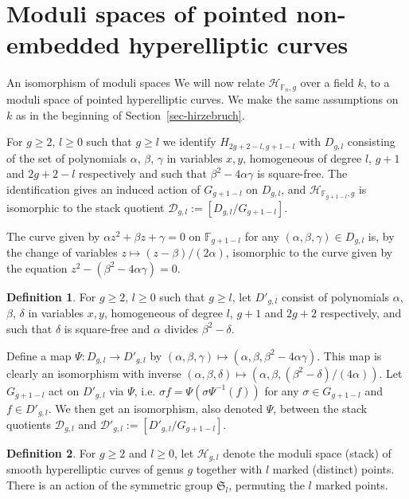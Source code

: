 \documentclass[10pt,a4paper,twoside]{amsart}
\theoremstyle{plain}
\theoremstyle{definition}
\newtheorem{defin}{Definition}
\theoremstyle{remark}
\begin{document}
\section{Moduli spaces of pointed non-embedded hyperelliptic curves}  
\begin{subsection}{An isomorphism of moduli spaces} \label{sec-iso} 
We will now relate $\mathcal{H}_{\mathbb{F}_n,g}$ over a field $k$, to a moduli space of pointed hyperelliptic curves. We make the same assumptions on $k$ as in the beginning of Section~\ref{sec-hirzebruch}.

For $g \geq 2$, $l \geq 0$ such that $g \geq l$ we identify $H_{2g+2-l,g+1-l}$ with $D_{g,l}$ consisting of the set of polynomials $\alpha$, $\beta$, $\gamma$ in variables $x,y$, homogeneous of degree $l$, $g+1$ and $2g+2-l$ respectively and such that $\beta^2-4\alpha\gamma$ is square-free. 
The identification gives an induced action of $G_{g+1-l}$ on $D_{g,l}$, and $\mathcal{H}_{\mathbb{F}_{g+1-l},g}$ is isomorphic to the stack quotient $\mathcal D_{g,l}:=[D_{g,l}/G_{g+1-l}]$. 

The curve given by $\alpha z^2+\beta z+\gamma=0$ on $\mathbb{F}_{g+1-l}$ for any $(\alpha,\beta,\gamma) \in D_{g,l}$ is, by the change of variables 
$z \mapsto (z-\beta)/(2\alpha)$, isomorphic to the curve given by the equation $z^2-(\beta^2-4\alpha \gamma)=0$. 
\begin{defin}
For $g \geq 2$, $l \geq 0$ such that $g \geq l$, let $D'_{g,l}$ consist of polynomials $\alpha$, $\beta$, $\delta$ in variables $x,y$, homogeneous of degree $l$, $g+1$ and $2g+2$ respectively, and such that $\delta$ is square-free and $\alpha$ divides $\beta^2-\delta$.    
\end{defin}

Define a map $\Psi: D_{g,l} \to D'_{g,l}$ by $(\alpha,\beta,\gamma) \mapsto (\alpha,\beta,\beta^2-4\alpha\gamma)$. This map is clearly an isomorphism with inverse $(\alpha,\beta,\delta) \mapsto (\alpha,\beta,(\beta^2-\delta)/(4\alpha))$. Let $G_{g+1-l}$ act on $D'_{g,l}$ via $\Psi$, i.e. $ \sigma f=\Psi(\sigma \Psi^{-1}(f))$ for any $\sigma \in G_{g+1-l}$ and $f \in D'_{g,l}$. We then get an isomorphism, also denoted $\Psi$, between the stack quotients $\mathcal D_{g,l}$ and $\mathcal D'_{g,l}:=[D'_{g,l}/G_{g+1-l}]$. 

\begin{defin} \label{def-1}
For $g \geq 2$ and $l \geq 0$, let $\mathcal H_{g,l}$ denote the moduli space (stack) of smooth hyperelliptic curves of genus $g$ together with $l$ marked (distinct) points. There is an action of the symmetric group $\mathfrak{S}_l$, permuting the $l$ marked points. 
\end{defin}


\end{subsection}
\end{document}
